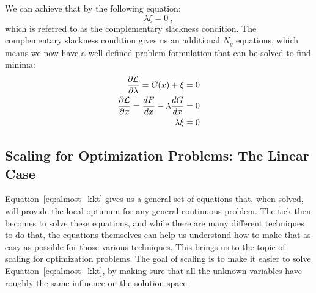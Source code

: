 \documentclass[conf]{new-aiaa}
\begin{document}
        We can achieve that by the following equation: 
        \begin{equation}
            \lambda \xi = 0 \ , 
        \end{equation}
        which is referred to as the complementary slackness condition. 
        The complementary slackness condition gives us an additional $N_g$ equations, which means we now have a well-defined problem formulation that can be solved to find minima: 
        \begin{align}
            \frac{\partial \mathcal{L}}{\partial \lambda} = G(x) + \xi &= 0 \notag \\
            \frac{\partial \mathcal{L}}{\partial x} = \frac{dF}{dx} - \lambda \frac{dG}{dx} &= 0 \notag \\
            \lambda \xi &= 0
            \label{eq:almost_kkt}
        \end{align}

    \subsection{Scaling for Optimization Problems: The Linear Case}

    Equation~\eqref{eq:almost_kkt} gives us a general set of equations that, when solved, will provide the local optimum for any general continuous problem. 
    The tick then becomes to solve these equations, and while there are many different techniques to do that, the equations themselves can help us understand how to make that as easy as possible for those various techniques. 
    This brings us to the topic of scaling for optimization problems. 
    The goal of {}scaling is to make it easier to solve Equation~\eqref{eq:almost_kkt}, by making sure that all the unknown variables have roughly the same influence on the solution space. 
\end{document}
